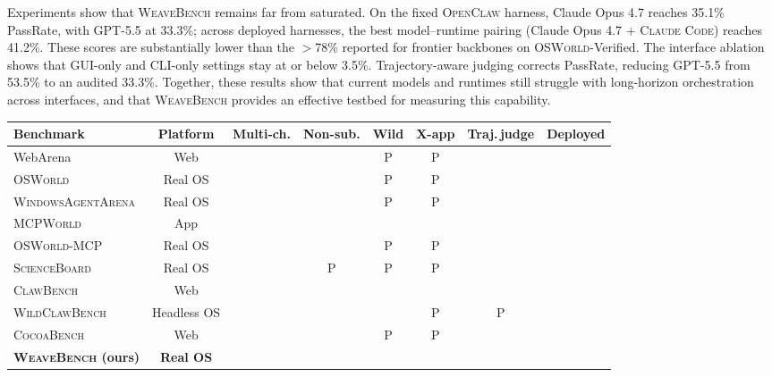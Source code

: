 \documentclass{llmxive}
\providecommand{\Eyeson}{\textsc{WeaveBench}\xspace}
\providecommand{\osworld}{\textsc{OSWorld}\xspace}
\providecommand{\cmark}{\ding{51}}
\providecommand{\xmark}{\ding{55}}
\begin{document}
Experiments show that \Eyeson{} remains far from saturated. On the fixed \textsc{OpenClaw} harness, Claude Opus 4.7 reaches 35.1\% PassRate, with GPT-5.5 at 33.3\%; across deployed harnesses, the best model--runtime pairing (Claude Opus 4.7 + \textsc{Claude Code}) reaches 41.2\%. These scores are substantially lower than the $>$78\% reported for frontier backbones on \osworld{}-Verified. The interface ablation shows that GUI-only and CLI-only settings stay at or below 3.5\%. Trajectory-aware judging corrects PassRate, reducing GPT-5.5 from 53.5\% to an audited 33.3\%. Together, these results show that current models and runtimes still struggle with long-horizon orchestration across interfaces, and that \Eyeson{} provides an effective testbed for measuring this capability.

\begin{table}[t]
\centering
\footnotesize
\setlength{\tabcolsep}{4pt}
\begin{tabular}{lccccccc}
\toprule
\textbf{Benchmark} & \textbf{Platform} & \textbf{Multi-ch.} & \textbf{Non-sub.} & \textbf{Wild} & \textbf{X-app} & \textbf{Traj.\,judge} & \textbf{Deployed} \\
\midrule
WebArena                       & Web         & \xmark & \xmark & P      & P      & \xmark & \xmark \\
\osworld{}                     & Real OS     & \xmark & \xmark & P      & P      & \xmark & \xmark \\
\textsc{WindowsAgentArena}     & Real OS     & \xmark & \xmark & P      & P      & \xmark & \xmark \\
\textsc{MCPWorld}              & App         & \cmark & \xmark & \xmark & \xmark & \xmark & \xmark \\
\textsc{OSWorld-MCP}           & Real OS     & \cmark & \xmark & P      & P      & \xmark & \xmark \\
\textsc{ScienceBoard}          & Real OS     & \cmark & P      & P      & P      & \xmark & \xmark \\
\textsc{ClawBench}             & Web         & \xmark & \xmark & \cmark & \cmark & \xmark & \cmark \\
\textsc{WildClawBench}         & Headless OS & \xmark & \xmark & \cmark & P      & P      & \cmark \\
\textsc{CocoaBench}            & Web         & \cmark & \xmark & P      & P      & \xmark & \xmark \\
\rowcolor{msfthighlight}
\textbf{\Eyeson{} (ours)}      & \textbf{Real OS} & \cmark & \cmark & \cmark & \cmark & \cmark & \cmark \\

\end{tabular}
\end{table}
\end{document}
